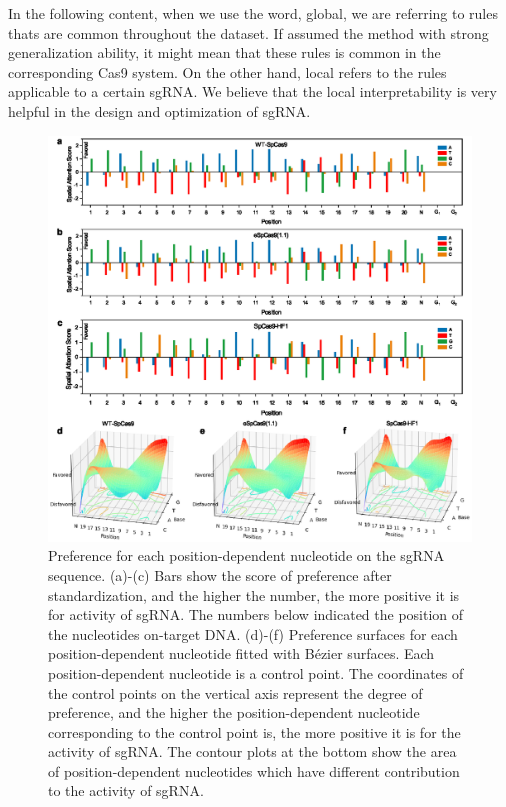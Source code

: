 \documentclass{bioinfo}
\begin{document}
In the following content, when we use the word, global, we are referring to rules thats are common throughout the dataset. 
If assumed the method with strong generalization ability, it might mean that these rules is common in the corresponding Cas9 system.
On the other hand, local refers to the rules applicable to a certain sgRNA. 
We believe that the local interpretability is very helpful in the design and optimization of sgRNA.
\begin{figure}[!tpb]
    \centerline{\includegraphics[width=178mm]{spatialattention.eps}}
    \caption{Preference for each position-dependent nucleotide on the sgRNA sequence. 
(a)-(c) Bars show the score of preference after standardization, and the higher the number, the more positive it is for activity of sgRNA. 
The numbers below indicated the position of the nucleotides on-target DNA. 
(d)-(f) Preference surfaces for each position-dependent nucleotide fitted with Bézier surfaces. 
Each position-dependent nucleotide is a control point. 
The coordinates of the control points on the vertical axis represent the degree of preference, 
and the higher the position-dependent nucleotide corresponding to the control point is, the more positive it is for the activity of sgRNA.
The contour plots at the bottom show the area of position-dependent nucleotides which have different contribution to the activity of sgRNA. 
}\label{fig:spatialattention}
\end{figure}
\end{document}

